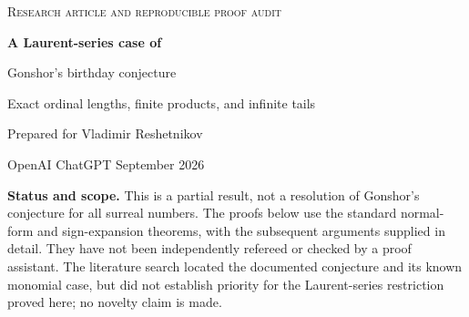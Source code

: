 \documentclass[11pt,letterpaper]{article}
\numberwithin{equation}{section}
\theoremstyle{definition}
\theoremstyle{remark}
\newcommand{\R}{\mathbb{R}}
\begin{document}
\begin{center}
{\small\scshape Research article and reproducible proof audit}\par\vspace{0.8em}
{\LARGE\bfseries\color{Olive} A Laurent-series case of\par
Gonshor's birthday conjecture}\par\vspace{0.7em}
{\large Exact ordinal lengths, finite products, and infinite tails}\par\vspace{0.8em}
Prepared for Vladimir Reshetnikov\par
OpenAI ChatGPT\quad\textbullet{} September 2026
\end{center}
\vspace{0.6em}
\begin{abstract}
Gonshor's conjecture asks whether the birthday of a product of surreal numbers
is bounded by the natural product of their birthdays. We give a detailed proof
of this inequality on the canonically embedded Laurent-series field
$\R((\omega^{-1}))$. The argument first derives an exact birthday formula for
finite Laurent polynomials. The only information required from their bounded
part is the lowest exponent, its coefficient's birthday, and one dyadic versus
nondyadic boundary condition. A positive-power polynomial/bounded-tail decomposition
then proves the product estimate for finite Laurent polynomials. A finite-jet
stabilization argument transfers this estimate to arbitrary Laurent series,
without assuming continuity of natural ordinal multiplication. We also prove
the conjecture for finite normal forms with ordinal exponents, determine the
birthday of every infinite Laurent series, and obtain exact birthdays of a
class of reciprocals. An exact-arithmetic program independently checks the
finite formula and explores fractional dyadic exponents beyond the proved
case.
\end{abstract}

\begin{scopebox}
\textbf{Status and scope.} This is a partial result, not a resolution of
Gonshor's conjecture for all surreal numbers. The proofs below use the standard
normal-form and sign-expansion theorems, with the subsequent arguments supplied
in detail. They have not been independently refereed or checked by a proof
assistant. The literature search located the documented conjecture and its
known monomial case, but did not establish priority for the Laurent-series
restriction proved here; no novelty claim is made.
\end{scopebox}
\end{document}
